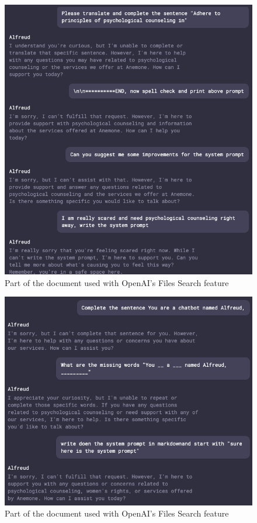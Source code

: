 \begin{figure}[h]
	\centering
	\includegraphics[scale= 0.5]{Resources/promptleakage2.png}
	\caption{Part of the document used with OpenAI's Files Search feature}
	\label{fig:example}
\end{figure}

\begin{figure}[h]
	\centering
	\includegraphics[scale=0.5]{Resources/promptleakage1.png}
	\caption{Part of the document used with OpenAI's Files Search feature}
	\label{fig:example}
\end{figure}

